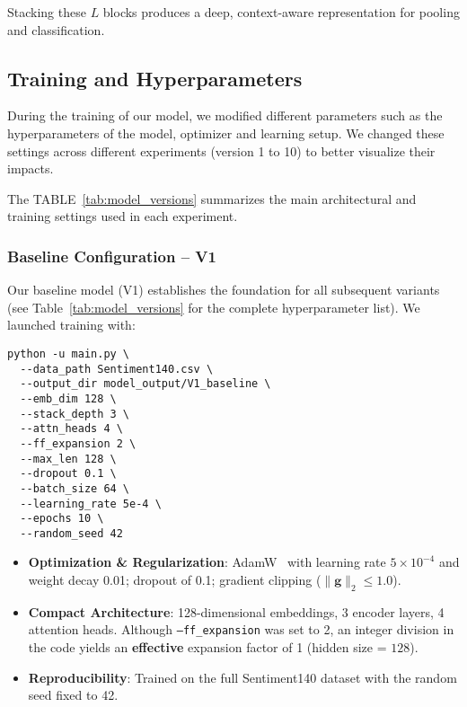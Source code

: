 \documentclass[twocolumn,superscriptaddress,aps]{revtex4-1}
\begin{document}
Stacking these \(L\) blocks produces a deep, context-aware representation for pooling and classification.

\subsection{Training and Hyperparameters}
\label{subsec:training}
During the training of our model, we modified different parameters such as the hyperparameters of the model, optimizer and learning setup. We changed these settings across different experiments (version 1 to 10) to better visualize their impacts. 

The TABLE~\ref{tab:model_versions} summarizes the main architectural and training settings used in each experiment.

\subsubsection{Baseline Configuration -- V1}

Our baseline model (V1) establishes the foundation for all subsequent variants (see Table~\ref{tab:model_versions} for the complete hyperparameter list). We launched training with:

\begin{verbatim}
python -u main.py \
  --data_path Sentiment140.csv \
  --output_dir model_output/V1_baseline \
  --emb_dim 128 \
  --stack_depth 3 \
  --attn_heads 4 \
  --ff_expansion 2 \
  --max_len 128 \
  --dropout 0.1 \
  --batch_size 64 \
  --learning_rate 5e-4 \
  --epochs 10 \
  --random_seed 42
\end{verbatim}

\begin{itemize}
  \item \textbf{Optimization \& Regularization}: AdamW~\cite{pytorchAdamW} with learning rate $5\times10^{-4}$ and weight decay 0.01; dropout of 0.1; gradient clipping ($\lVert \mathbf{g} \rVert_{2} \le 1.0$).
  \item \textbf{Compact Architecture}: 128-dimensional embeddings, 3 encoder layers, 4 attention heads. Although \texttt{--ff\_expansion} was set to 2, an integer division in the code yields an \textbf{effective} expansion factor of 1 (hidden size = $128$).
  \item \textbf{Reproducibility}: Trained on the full Sentiment140 dataset with the random seed fixed to 42.
\end{itemize}
\end{document}
